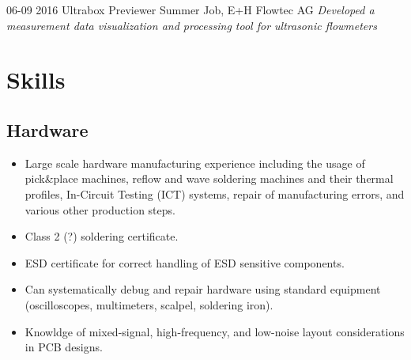 \documentclass[]{friggeri-cv}
\begin{document}
\begin{entrylist}
  \entry
    {06-09 2016}
    {Ultrabox Previewer}
    {Summer Job, E+H Flowtec AG}
    {\emph{Developed a measurement data visualization and processing tool for ultrasonic flowmeters}}
\end{entrylist}

\section{Skills}

\subsection{Hardware}
\begin{itemize}
    \item Large scale hardware manufacturing experience including the usage of pick\&place machines, reflow and wave soldering machines and their thermal profiles,  In-Circuit Testing (ICT) systems, repair of manufacturing errors, and various other production steps.
    \item Class 2 (?) soldering certificate.
    \item ESD certificate for correct handling of ESD sensitive components.
    \item Can systematically debug and repair hardware using standard equipment (oscilloscopes, multimeters, scalpel, soldering iron).
    \item Knowldge of mixed-signal, high-frequency, and low-noise layout considerations in PCB designs.
\end{itemize}
\end{document}
